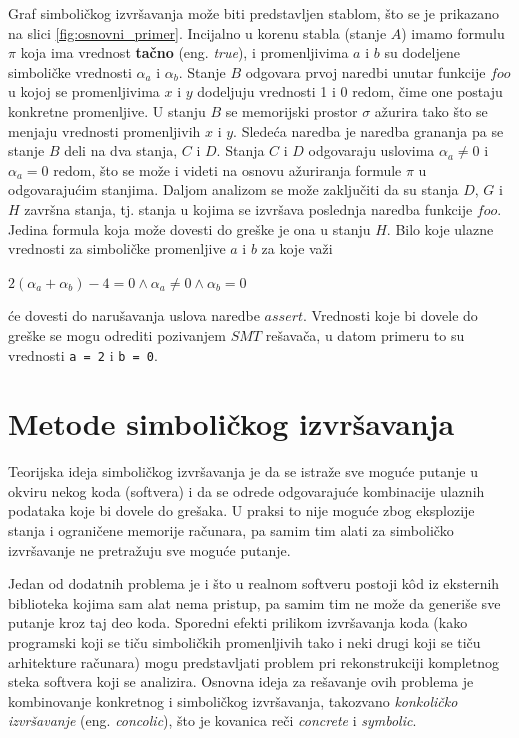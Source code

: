 \documentclass[12pt,oneside]{memoir}
\begin{document}
Graf simboličkog izvršavanja može biti predstavljen stablom, što se je prikazano na slici \ref{fig:osnovni_primer}. Incijalno u korenu stabla (stanje $A$) imamo formulu $\pi$ koja ima vrednost \textbf{tačno} (eng. \textit{true}), i promenljivima $a$ i $b$ su dodeljene simboličke vrednosti $\alpha_a$ i $\alpha_b$. Stanje $B$ odgovara prvoj naredbi unutar funkcije $foo$ u kojoj se promenljivima $x$ i $y$ dodeljuju vrednosti 1 i 0 redom, čime one postaju konkretne promenljive. U stanju $B$ se memorijski prostor $\sigma$ ažurira tako što se menjaju vrednosti promenljivih $x$ i $y$. Sledeća naredba je naredba grananja pa se stanje $B$ deli na dva stanja, $C$ i $D$. Stanja $C$ i $D$ odgovaraju uslovima $\alpha_a \neq 0$ i $\alpha_a = 0$ redom, što se može i videti na osnovu ažuriranja formule $\pi$ u odgovarajućim stanjima. Daljom analizom se može zaključiti da su stanja $D$, $G$ i $H$ završna stanja, tj. stanja u kojima se izvršava poslednja naredba funkcije $foo$. Jedina formula koja može dovesti do greške je ona u stanju $H$. Bilo koje ulazne vrednosti za simboličke promenljive $a$ i $b$ za koje važi
\vskip 0.2in
\centerline{$2(\alpha_a + \alpha_b) - 4 = 0 \land \alpha_a \neq 0 \land \alpha_b = 0$}
\vskip 0.2in
\noindent će dovesti do narušavanja uslova naredbe $assert$. Vrednosti koje bi dovele do greške se mogu odrediti pozivanjem $SMT$ rešavača, u datom primeru to su vrednosti \texttt{a = 2} i \texttt{b = 0}.

\section{Metode simboličkog izvršavanja}
Teorijska ideja simboličkog izvršavanja je da se istraže sve moguće putanje u okviru nekog koda (softvera) i da se odrede odgovarajuće kombinacije ulaznih podataka koje bi dovele do grešaka. U praksi to nije moguće zbog eksplozije stanja i ograničene memorije računara, pa samim tim alati za simboličko izvršavanje ne pretražuju sve moguće putanje. 

Jedan od dodatnih problema je i što u realnom softveru postoji k\^od iz eksternih biblioteka kojima sam alat nema pristup, pa samim tim ne može da generiše sve putanje kroz taj deo koda. Sporedni efekti prilikom izvršavanja koda (kako programski koji se tiču simboličkih promenljivih tako i neki drugi koji se tiču arhitekture računara) mogu predstavljati problem pri rekonstrukciji kompletnog steka softvera koji se analizira. Osnovna ideja za rešavanje ovih problema je kombinovanje konkretnog i simboličkog izvršavanja, takozvano \textit{konkoličko izvršavanje} (eng. \textit{concolic}), što je kovanica reči \textit{concrete} i \textit{symbolic}.
\end{document}
